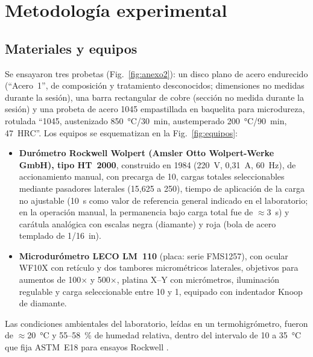 \documentclass[journal,11pt]{IEEEtran}
\begin{document}
\section{Metodología experimental}
\subsection{Materiales y equipos}
Se ensayaron tres probetas (Fig.~\ref{fig:anexo2}): un disco plano de acero endurecido (``Acero~1'', de composición y tratamiento desconocidos; dimensiones no medidas durante la sesión), una barra rectangular de cobre (sección no medida durante la sesión) y una probeta de acero 1045 empastillada en baquelita para microdureza, rotulada ``1045, austenizado 850~\si{\degreeCelsius}/30~min, austemperado 200~\si{\degreeCelsius}/90~min, 47~HRC''. Los equipos se esquematizan en la Fig.~\ref{fig:equipos}:
\begin{itemize}
\item \textbf{Durómetro Rockwell Wolpert (Amsler Otto Wolpert-Werke GmbH), tipo HT~2000}, construido en 1984 (220~V, 0,31~A, 60~Hz), de accionamiento manual, con precarga de \SI{10}{\kgf}, cargas totales seleccionables mediante pasadores laterales (15,625 a \SI{250}{\kgf}), tiempo de aplicación de la carga no ajustable (10~s como valor de referencia general indicado en el laboratorio; en la operación manual, la permanencia bajo carga total fue de $\approx$\SI{3}{\second}) y carátula analógica con escalas negra (diamante) y roja (bola de acero templado de 1/16~in).
\item \textbf{Microdurómetro LECO LM~110} (placa: serie FMS1257), con ocular WF10X con retículo y dos tambores micrométricos laterales, objetivos para aumentos de 100$\times$ y 500$\times$, platina X--Y con micrómetros, iluminación regulable y carga seleccionable entre \SI{10}{\gf} y \SI{1}{\kgf}, equipado con indentador Knoop de diamante.
\end{itemize}
Las condiciones ambientales del laboratorio, leídas en un termohigrómetro, fueron de $\approx$\SI{20}{\degreeCelsius} y 55--58~\% de humedad relativa, dentro del intervalo de 10 a \SI{35}{\degreeCelsius} que fija ASTM~E18 para ensayos Rockwell \cite{astm18}.
\end{document}
